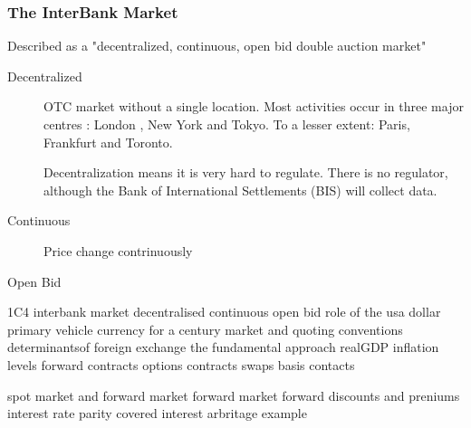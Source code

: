 \subsubsection*{The InterBank Market}


Described as a "decentralized, continuous, open bid double auction market"

\begin{description}
\item[Decentralized] OTC market without a single location. Most activities occur in three major centres : London , New York and Tokyo. To a lesser extent: Paris, Frankfurt and Toronto.

Decentralization means it is very hard to regulate. There is no regulator, although the Bank of International Settlements (BIS) will 
collect data.
 
\item[Continuous] Price change contrinuously

\item[Open Bid]
 
\end{description}

1C4
interbank market
decentralised
continuous
open bid
role of the usa dollar
primary vehicle currency for a century
market and quoting conventions
determinantsof foreign exchange
the fundamental approach
realGDP
inflation levels
forward contracts
options contracts
swaps
basis contacts

spot market and forward market
forward market
forward discounts and preniums
interest rate parity
covered interest arbritage example

 
 
 
